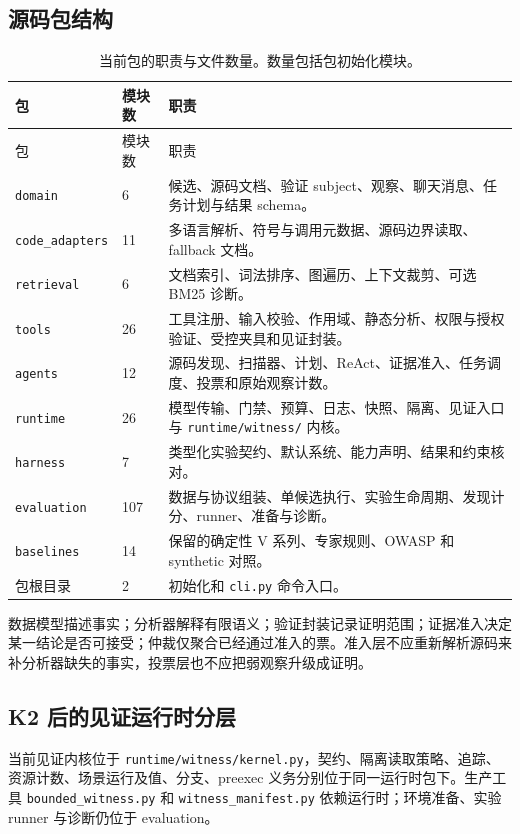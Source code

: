\documentclass[UTF8,a4paper,zihao=-4,fontset=none]{ctexart}
\newcommand{\code}[1]{{\small\nolinkurl{#1}}}
\begin{document}
\subsection{源码包结构}
\begin{longtable}{L{27mm}L{17mm}L{105mm}}
\caption{当前包的职责与文件数量。数量包括包初始化模块。}\label{tab:packages}\\
\toprule 包 & 模块数 & 职责\\\midrule\endfirsthead
\toprule 包 & 模块数 & 职责\\\midrule\endhead
\code{domain} & 6 & 候选、源码文档、验证 subject、观察、聊天消息、任务计划与结果 schema。\\
\code{code_adapters} & 11 & 多语言解析、符号与调用元数据、源码边界读取、fallback 文档。\\
\code{retrieval} & 6 & 文档索引、词法排序、图遍历、上下文裁剪、可选 BM25 诊断。\\
\code{tools} & 26 & 工具注册、输入校验、作用域、静态分析、权限与授权验证、受控夹具和见证封装。\\
\code{agents} & 12 & 源码发现、扫描器、计划、ReAct、证据准入、任务调度、投票和原始观察计数。\\
\code{runtime} & 26 & 模型传输、门禁、预算、日志、快照、隔离、见证入口与 \code{runtime/witness/} 内核。\\
\code{harness} & 7 & 类型化实验契约、默认系统、能力声明、结果和约束核对。\\
\code{evaluation} & 107 & 数据与协议组装、单候选执行、实验生命周期、发现计分、runner、准备与诊断。\\
\code{baselines} & 14 & 保留的确定性 V 系列、专家规则、OWASP 和 synthetic 对照。\\
包根目录 & 2 & 初始化和 \code{cli.py} 命令入口。\\
\bottomrule
\end{longtable}

数据模型描述事实；分析器解释有限语义；验证封装记录证明范围；证据准入决定某一结论是否可接受；仲裁仅聚合已经通过准入的票。准入层不应重新解析源码来补分析器缺失的事实，投票层也不应把弱观察升级成证明。

\subsection{K2 后的见证运行时分层}
当前见证内核位于 \code{runtime/witness/kernel.py}，契约、隔离读取策略、追踪、资源计数、场景运行及值、分支、preexec 义务分别位于同一运行时包下。生产工具 \code{bounded_witness.py} 和 \code{witness_manifest.py} 依赖运行时；环境准备、实验 runner 与诊断仍位于 evaluation。
\end{document}
